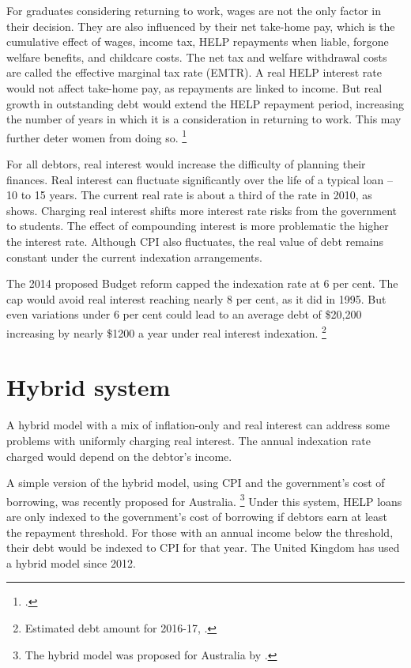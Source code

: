 \documentclass[embargoed]{grattan}
\begin{document}
For graduates considering returning to work, wages are not the only factor in their decision.
They are also influenced by their net take-home pay, which is the cumulative effect of wages, income tax, \gls{HELP} repayments when liable, forgone welfare benefits, and childcare costs.
The net tax and welfare withdrawal costs are called the effective marginal tax rate (EMTR).
A real \gls{HELP} interest rate would not affect take-home pay, as repayments are linked to income.
But real growth in outstanding debt would extend the \gls{HELP} repayment period, increasing the number of years in which it is a consideration in returning to work.
This may further deter women from doing so.%
\footcites[][Section~4.2.1]{Daley2012Gamechangerseconomic}{Commission2014Childcareearlychildhood}


For all debtors, real interest would increase the difficulty of planning their finances.
Real interest can fluctuate significantly over the life of a typical loan -- 10 to 15 years.
The current real rate is about a third of the rate in 2010, as  shows.
Charging real interest shifts more interest rate risks from the government to students.
The effect of compounding interest is more problematic the higher the interest rate.
Although \gls{CPI} also fluctuates, the real value of debt remains constant under the current indexation arrangements.

The 2014 proposed Budget reform capped the indexation rate at 6 per cent.
The cap would avoid real interest reaching nearly 8 per cent, as it did in 1995.
But even variations under 6 per cent could lead to an average debt of \$20,200 increasing by nearly \$1200 a year under real interest indexation.%
\footnote{Estimated debt amount for 2016-17, \textcite[][59]{Education2016Portfoliobudgetstatements}.}

\section{Hybrid system}\label{sec:hybrid-system}

A hybrid model with a mix of inflation-only and real interest can address some problems with uniformly charging real interest.
The annual indexation rate charged would depend on the debtor's income.

A simple version of the hybrid model, using \gls{CPI} and the government's cost of borrowing, was recently proposed for Australia.%
\footnote{The hybrid model was proposed for Australia by \textcite{Chapman2014HELPinterestrate}.} Under this system, \gls{HELP} loans are only indexed to the government's cost of borrowing if debtors earn at least the repayment threshold.
For those with an annual income below the threshold, their debt would be indexed to \gls{CPI} for that year.
The United Kingdom has used a hybrid model since 2012.
\end{document}
